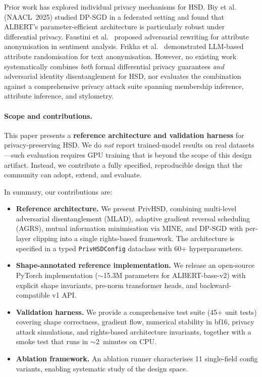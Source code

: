 \documentclass{article}
\begin{document}
Prior work has explored individual privacy mechanisms for HSD.
Biy et al.~\cite{biy2025privacy} (NAACL~2025) studied DP-SGD in a
federated setting and found that ALBERT's parameter-efficient architecture
is particularly robust under differential privacy.
Faustini et al.~\cite{faustini2025idt} proposed adversarial rewriting for
attribute anonymisation in sentiment analysis.
Frikha et al.~\cite{frikha2025incognitext} demonstrated LLM-based attribute
randomisation for text anonymisation.
However, no existing work systematically combines \emph{both} formal
differential privacy guarantees \emph{and} adversarial identity
disentanglement for HSD, nor evaluates the combination against a
comprehensive privacy attack suite spanning membership inference,
attribute inference, and stylometry.

\paragraph{Scope and contributions.}
This paper presents a \textbf{reference architecture and validation
harness} for privacy-preserving HSD. We do \emph{not} report
trained-model results on real datasets---such evaluation requires GPU
training that is beyond the scope of this design artifact.
Instead, we contribute a fully specified, reproducible design that the
community can adopt, extend, and evaluate.

In summary, our contributions are:

\begin{itemize}
  \item \textbf{Reference architecture.} We present PrivHSD, combining
        multi-level adversarial disentanglement (MLAD), adaptive gradient
        reversal scheduling (AGRS), mutual information minimisation via
        MINE, and DP-SGD with per-layer clipping into a single
        rights-based framework. The architecture is specified in a typed
        \texttt{PrivHSDConfig} dataclass with 60+ hyperparameters.
  \item \textbf{Shape-annotated reference implementation.} We release an
        open-source PyTorch implementation ($\sim$15.3M parameters for
        ALBERT-base-v2) with explicit shape invariants, pre-norm
        transformer heads, and backward-compatible v1 API.
  \item \textbf{Validation harness.} We provide a comprehensive test suite
        (45+ unit tests) covering shape correctness, gradient flow,
        numerical stability in bf16, privacy attack simulations, and
        rights-based architecture invariants, together with a smoke test
        that runs in $\sim$2~minutes on CPU.
  \item \textbf{Ablation framework.} An ablation runner characterises
        11 single-field config variants, enabling systematic study of the
        design space.
\end{itemize}
\end{document}
